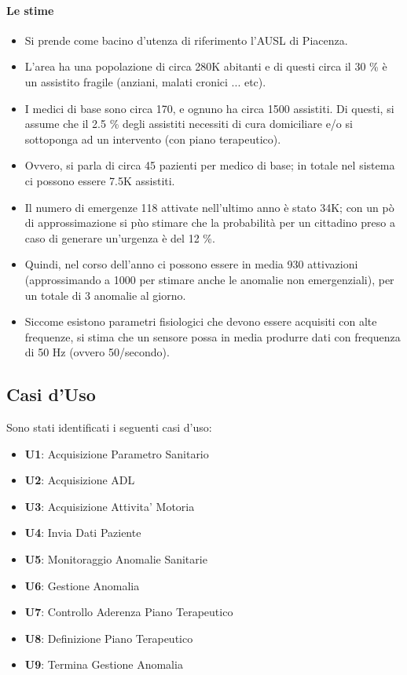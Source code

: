 \documentclass[a4paper,11pt,oneside, table]{article}
\begin{document}
\paragraph{Le stime}
\begin{itemize}
  \item Si prende come bacino d'utenza di riferimento l'AUSL di Piacenza.
  \item L'area ha una popolazione di circa 280K abitanti e di questi circa il 30 \% \`e un assistito fragile (anziani, malati cronici ... etc).
  \item I medici di base sono circa 170, e ognuno ha circa 1500 assistiti. Di questi, si assume che il 2.5 \% degli assistiti necessiti di cura domiciliare e/o si sottoponga ad un intervento (con piano terapeutico).
  \item Ovvero, si parla di circa 45 pazienti per medico di base; in totale nel sistema ci possono essere 7.5K assistiti.
  \item Il numero di emergenze 118 attivate nell'ultimo anno \`e stato 34K; con un p\`o di approssimazione si p\`uo stimare che la probabilit\`a per un cittadino preso a caso di generare un'urgenza \`e del 12 \%.
  \item Quindi, nel corso dell'anno ci possono essere in media 930 attivazioni (approssimando a 1000 per stimare anche le anomalie non emergenziali), per un totale di 3 anomalie al giorno.
  \item Siccome esistono parametri fisiologici che devono essere acquisiti con alte frequenze, si stima che un sensore possa in media produrre dati con frequenza di 50 Hz (ovvero 50/secondo).
\end{itemize}

\subsection{Casi d'Uso}

Sono stati identificati i seguenti casi d'uso:
\begin{itemize}
  \item \textbf{U1}: Acquisizione Parametro Sanitario
  \item \textbf{U2}: Acquisizione ADL
  \item \textbf{U3}: Acquisizione Attivita' Motoria
  \item \textbf{U4}: Invia Dati Paziente
  \item \textbf{U5}: Monitoraggio Anomalie Sanitarie
  \item \textbf{U6}: Gestione Anomalia
  \item \textbf{U7}: Controllo Aderenza Piano Terapeutico
  \item \textbf{U8}: Definizione Piano Terapeutico
  \item \textbf{U9}: Termina Gestione Anomalia
\end{itemize}
\end{document}
